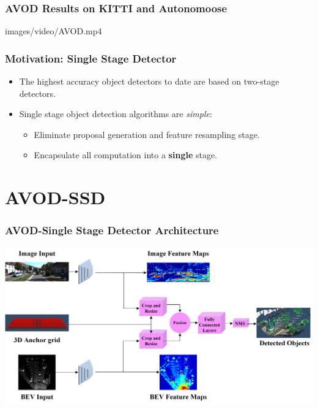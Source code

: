 \documentclass[10pt,fleqn,unknownkeysallowed]{beamer}
\begin{document}
\begin{frame}
	\frametitle{AVOD Results on KITTI and Autonomoose}
	\begin{center}
		{images/video/AVOD.mp4}
	\end{center}
\end{frame}

\begin{frame}
	\frametitle{Motivation: Single Stage Detector}
	\linespread{1.5}
	\begin{itemize}
		\item{The highest accuracy object detectors to date are based on two-stage detectors.}
		\item{Single stage object detection algorithms are \textit{simple}:}
		\begin{itemize}
			\item{Eliminate proposal generation and feature resampling stage.}
			\item{Encapsulate all computation into a \textbf{single} stage.}
		\end{itemize}
	\end{itemize}
\end{frame}

\section{AVOD-SSD}
\begin{frame}
	\frametitle{AVOD-Single Stage Detector Architecture}
		\includegraphics[width=1.0\textwidth]{images/avod_ssd}
\end{frame}
\end{document}
